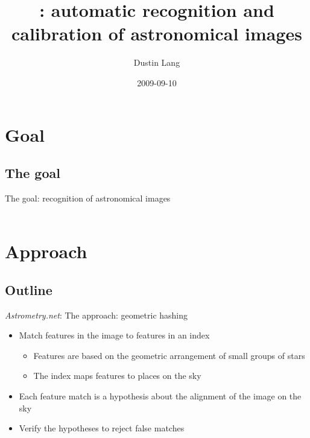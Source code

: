 \documentclass[compress]{beamer}
\title[\an]
{\an: automatic recognition and calibration of astronomical images}
\author{Dustin Lang}
\date{2009-09-10}
\newcommand{\an}{\emph{Astrometry.net}\xspace}
\begin{document}
\begin{frame}
  \titlepage
\end{frame}

\section{Goal}

\subsection{The goal}

\begin{frame}[fragile]{The goal: recognition of astronomical images}
  \vspace{-1ex}
  \\
   \\
  \vfill
\end{frame}

\section{Approach}

\subsection{Outline}

\begin{frame}{\an: The approach: geometric hashing}
  \begin{itemize}
    \addtolength{\itemsep}{0.5ex}
  \item Match \alert{features} in the image to features in an \alert{index}
    \begin{itemize}
    \addtolength{\itemsep}{0.5ex}
    \item Features are based on the \alert{geometric arrangement} of small groups of stars
    \item The \alert{index} maps \alert{features} to \alert{places on the sky}
    \end{itemize}
  \item Each feature match is a \alert{hypothesis} about the alignment of the image on the sky
  \item \alert{Verify} the hypotheses to reject false matches
  \end{itemize}
\end{frame}
\end{document}
